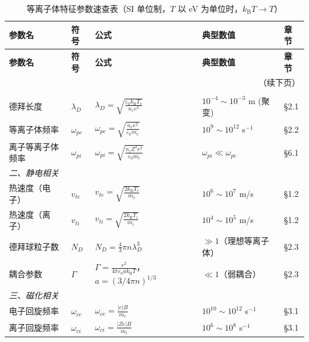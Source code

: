 \documentclass[12pt,a4paper,openany,oneside]{book}
\newcommand{\eps}{\varepsilon}
\begin{document}
{\scriptsize
\setlength{\tabcolsep}{2pt}
\renewcommand{\arraystretch}{0.78}
\begin{longtable}{@{}p{2.2cm}p{1.2cm}p{7.1cm}p{2.9cm}p{1.4cm}@{}}
\caption{等离子体特征参数速查表（SI 单位制，$T$ 以 eV 为单位时，$k_\mathrm{B}T\to T$）}
\label{tab:plasma-parameters}\\
\toprule
\textbf{参数名} & \textbf{符号} & \textbf{公式} & \textbf{典型数值} & \textbf{章节} \\
\midrule
\endfirsthead
\toprule
\textbf{参数名} & \textbf{符号} & \textbf{公式} & \textbf{典型数值} & \textbf{章节} \\
\midrule
\endhead
\midrule
\multicolumn{5}{r}{\small（续下页）} \\
\endfoot
\bottomrule
\endlastfoot
\multicolumn{5}{l}{\textit{一、基本定义}} \\
\midrule
德拜长度 & $\lambda_D$ & $\displaystyle\lambda_D = \sqrt{\frac{\eps_0 k_\mathrm{B} T_e}{n_e e^2}}$ & $10^{-4}\sim10^{-3}$ m (聚变) & \S 2.1 \\
等离子体频率 & $\omega_{pe}$ & $\displaystyle\omega_{pe} = \sqrt{\frac{n_e e^2}{\eps_0 m_e}}$ & $10^{9}\sim10^{12}$ s$^{-1}$ & \S 2.2 \\
离子等离子体频率 & $\omega_{pi}$ & $\displaystyle\omega_{pi} = \sqrt{\frac{n_i Z^2 e^2}{\eps_0 m_i}}$ & $\omega_{pi}\ll\omega_{pe}$ & \S 6.1 \\
\midrule
\multicolumn{5}{l}{\textit{二、静电相关}} \\
\midrule
热速度（电子） & $v_{te}$ & $\displaystyle v_{te} = \sqrt{\frac{2k_\mathrm{B}T_e}{m_e}}$ & $10^{6}\sim10^{7}$ m/s & \S 1.2 \\
热速度（离子） & $v_{ti}$ & $\displaystyle v_{ti} = \sqrt{\frac{2k_\mathrm{B}T_i}{m_i}}$ & $10^{4}\sim10^{5}$ m/s & \S 1.2 \\
德拜球粒子数 & $N_D$ & $\displaystyle N_D = \tfrac{4}{3}\pi n\lambda_D^3$ & $\gg 1$（理想等离子体）& \S 2.3 \\
耦合参数 & $\Gamma$ & $\displaystyle\Gamma = \frac{e^2}{4\pi\eps_0 a k_\mathrm{B}T}$，$a=(3/4\pi n)^{1/3}$ & $\ll 1$（弱耦合）& \S 2.3 \\
\midrule
\multicolumn{5}{l}{\textit{三、磁化相关}} \\
\midrule
电子回旋频率 & $\omega_{ce}$ & $\displaystyle\omega_{ce} = \frac{|e|B}{m_e}$ & $10^{10}\sim10^{12}$ s$^{-1}$ & \S 3.1 \\
离子回旋频率 & $\omega_{ci}$ & $\displaystyle\omega_{ci} = \frac{|Ze|B}{m_i}$ & $10^{6}\sim10^{8}$ s$^{-1}$ & \S 3.1 \\

\end{longtable}}
\end{document}

